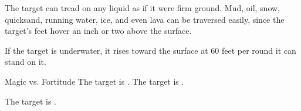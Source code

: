 \begin{spellheader}
    \spelldur{\durlong \dismissable}
\end{spellheader}
\begin{spelleffects}
    \spelleffect The target can tread on any liquid as if it were firm ground. Mud, oil, snow, quicksand, running water, ice, and even lava can be traversed easily, since the target's feet hover an inch or two above the surface.
    \par If the target is underwater, it rises toward the surface at 60 feet per round it can stand on it.
\end{spelleffects}
\begin{spellfooter}

\end{spellfooter}

\begin{spellheader}
    \spelldur{\durshort}
\end{spellheader}
\begin{spelleffects}
    \begin{spellattack}{Magic vs. Fortitude}
        \spellsuccess The target is \exhausted.
        \spellfailure The target is \fatigued.
    \end{spellattack}
\end{spelleffects}
\begin{spellfooter}

\end{spellfooter}

\begin{spellheader}
    \spelldur{\durshort}
\end{spellheader}
\begin{spelleffects}
    \spelleffect The target is \fatigued.
\end{spelleffects}
\begin{spellfooter}

\end{spellfooter}

